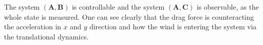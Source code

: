 The system $(\mathbf{A},\mathbf{B})$ is controllable and the system $(\mathbf{A},\mathbf{C})$ is observable, as the whole state is measured. One can see clearly that the drag force is counteracting the acceleration in $x$ and $y$ direction and how the wind is entering the system via the translational dynamics. 

